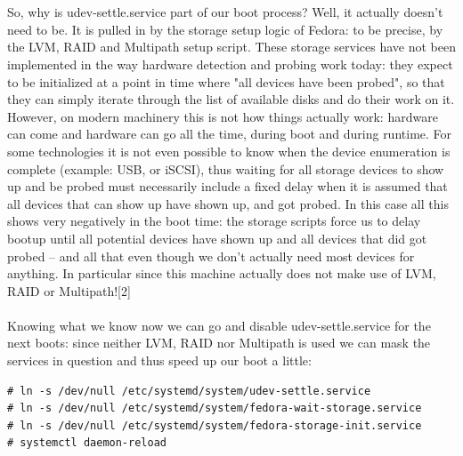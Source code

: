\documentclass[titlepage]{article}
\begin{document}
\\
\\
So, why is udev-settle.service part of our boot process? Well, it actually doesn't need to be. It is pulled in by the storage setup logic of Fedora: to be precise, by the LVM, RAID and Multipath setup script. These storage services have not been implemented in the way hardware detection and probing work today: they expect to be initialized at a point in time where "all devices have been probed", so that they can simply iterate through the list of available disks and do their work on it. However, on modern machinery this is not how things actually work: hardware can come and hardware can go all the time, during boot and during runtime. For some technologies it is not even possible to know when the device enumeration is complete (example: USB, or iSCSI), thus waiting for all storage devices to show up and be probed must necessarily include a fixed delay when it is assumed that all devices that can show up have shown up, and got probed. In this case all this shows very negatively in the boot time: the storage scripts force us to delay bootup until all potential devices have shown up and all devices that did got probed -- and all that even though we don't actually need most devices for anything. In particular since this machine actually does not make use of LVM, RAID or Multipath![2]
\\
\\
Knowing what we know now we can go and disable udev-settle.service for the next boots: since neither LVM, RAID nor Multipath is used we can mask the services in question and thus speed up our boot a little:
\begin{lstlisting}
# ln -s /dev/null /etc/systemd/system/udev-settle.service
# ln -s /dev/null /etc/systemd/system/fedora-wait-storage.service
# ln -s /dev/null /etc/systemd/system/fedora-storage-init.service
# systemctl daemon-reload
\end{lstlisting}
\end{document}
